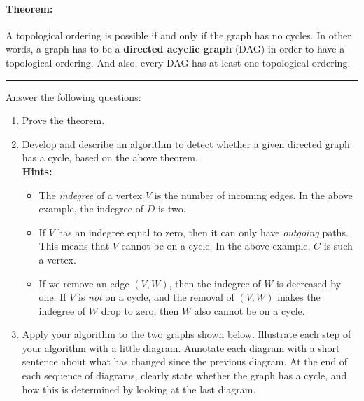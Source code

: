 \documentclass[a4paper]{article}
\newcounter{question}
\begin{document}
\paragraph{Theorem:}
A topological ordering is possible if and only if the graph has no cycles.
In other words, a graph has to be a \textbf{directed acyclic graph} (DAG) in order to have a topological ordering.
And also, every DAG has at least one topological ordering.

\vspace{\baselineskip}
\noindent\hrule
\vspace{\baselineskip}

\noindent
Answer the following questions:

\begin{enumerate}
\item
  Prove the theorem.
\item
  Develop and describe an algorithm to detect whether a given directed graph has a cycle, based on the above theorem.\\
  \textbf{Hints:}
  \begin{itemize}
  \item
    The \emph{indegree} of a vertex $V$ is the number of incoming edges.
    In the above example, the indegree of $D$ is two.
  \item
    If $V$ has an indegree equal to zero, then it can only have \emph{outgoing} paths.
    This means that $V$ cannot be on a cycle.
    In the above example, $C$ is such a vertex.
  \item
    If we remove an edge $(V,W)$, then the indegree of $W$ is decreased by one.
    If $V$ is \emph{not} on a cycle, and the removal of $(V,W)$ makes the indegree of $W$ drop to zero, then $W$ also cannot be on a cycle.
  \end{itemize}
\item
  Apply your algorithm to the two graphs shown below.
  Illustrate each step of your algorithm with a little diagram.
  Annotate each diagram with a short sentence about what has changed since the previous diagram.
  At the end of each sequence of diagrams, clearly state whether the graph has a cycle, and how this is determined by looking at the last diagram.
\end{enumerate}

\begin{center}
\end{center}
\end{document}
